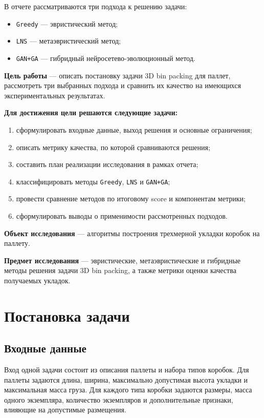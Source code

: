 \documentclass[14pt,a4paper]{extarticle}
\begin{document}
В отчете рассматриваются три подхода к решению задачи:
\begin{itemize}
  \item \texttt{Greedy} --- эвристический метод;
  \item \texttt{LNS} --- метаэвристический метод;
  \item \texttt{GAN+GA} --- гибридный нейросетево-эволюционный метод.
\end{itemize}

\textbf{Цель работы} --- описать постановку задачи 3D bin packing для паллет, рассмотреть три выбранных подхода и сравнить их качество на имеющихся экспериментальных результатах.

\textbf{Для достижения цели решаются следующие задачи:}
\begin{enumerate}
  \item сформулировать входные данные, выход решения и основные ограничения;
  \item описать метрику качества, по которой сравниваются решения;
  \item составить план реализации исследования в рамках отчета;
  \item классифицировать методы \texttt{Greedy}, \texttt{LNS} и \texttt{GAN+GA};
  \item провести сравнение методов по итоговому score и компонентам метрики;
  \item сформулировать выводы о применимости рассмотренных подходов.
\end{enumerate}

\textbf{Объект исследования} --- алгоритмы построения трехмерной укладки коробок на паллету.

\textbf{Предмет исследования} --- эвристические, метаэвристические и гибридные методы решения задачи 3D bin packing, а также метрики оценки качества получаемых укладок.

\pagebreak

\section{Постановка задачи}

\subsection{Входные данные}

Вход одной задачи состоит из описания паллеты и набора типов коробок. Для паллеты задаются длина, ширина, максимально допустимая высота укладки и максимальная масса груза. Для каждого типа коробки задаются размеры, масса одного экземпляра, количество экземпляров и дополнительные признаки, влияющие на допустимые размещения.
\end{document}
